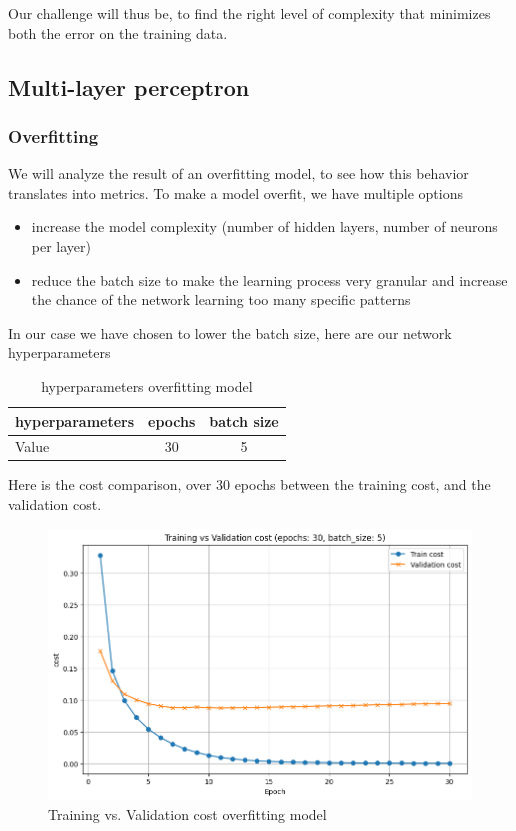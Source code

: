 \documentclass[a4paper, twocolumn, twoside]{article}
\begin{document}
	Our challenge will thus be, to find the right level of complexity that minimizes both the error on the training data.

	\subsection{Multi-layer perceptron}
        \subsubsection{Overfitting}
	   We will analyze the result of an overfitting model, to see 
	how this behavior translates into metrics. To make a model overfit, we have multiple options

	\begin{itemize}
		\item increase the model complexity (number of hidden layers, number of neurons per layer)
		\item reduce the batch size to make the learning process very granular 
			and increase the chance of the network learning too many specific patterns
	\end{itemize}

	In our case we have chosen to lower the batch size, here are our network hyperparameters

	\begin{table}[H]
	\centering
	\begin{tabular}{|l|c|c|}
	\hline
	hyperparameters & epochs & batch size  \\
	\hline
	Value & 30 & 5   \\
	\hline
	\end{tabular}
	\caption{hyperparameters overfitting model}
	\end{table}
        Here is the cost comparison, over 30 epochs between the training cost, and the validation cost.
	\begin{figure}[H]
		\begin{center}
			\includegraphics[width=\columnwidth]{images/cost_overfit.png}
		\end{center}
		\caption{Training vs. Validation cost overfitting model}\label{fig:cost_overfit}
	\end{figure}
\end{document}
